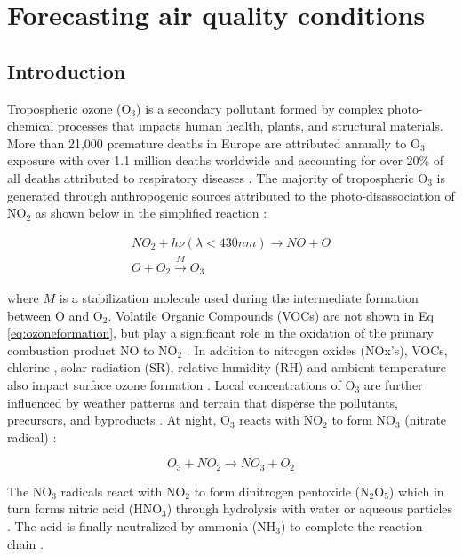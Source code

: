 \chapter{Forecasting air quality conditions}

\section{Introduction}

Tropospheric ozone (O$_{3}$) is a secondary pollutant formed by complex photo-chemical processes that impacts human health, plants, and structural materials. More than 21,000 premature deaths in Europe are attributed annually to O$_{3}$ exposure \citep{WHO2008} with over 1.1 million deaths worldwide and accounting for over 20\% of all deaths attributed to respiratory diseases \citep{Malley2017}. The majority of tropospheric O$_{3}$ is generated through anthropogenic sources \citep{Lelieveld2000, Cooper2006} attributed to the photo-disassociation of NO$_{2}$ as shown below in the simplified reaction \citep{Finlayson1993}:

\begin{equation}
\label{eq:ozoneformation}
\begin{gathered}
NO_{2}+h\nu (\lambda < 430nm) \rightarrow NO+O \\
O+O_{2}\overset{M}{\rightarrow} O_{3}
\end{gathered}
\end{equation}

\noindent
where $M$ is a stabilization molecule used during the intermediate formation between O and O$_{2}$. Volatile Organic Compounds (VOCs) are not shown in Eq \ref{eq:ozoneformation}, but play a significant role in the oxidation of the primary combustion product NO to NO$_{2}$ \citep{Song2011}. In addition to nitrogen oxides (NOx's), VOCs, chlorine \citep{Thornton2010}, solar radiation (SR), relative humidity (RH) and ambient temperature also impact surface ozone formation \citep{Sadanaga2003}.  Local concentrations of O$_{3}$ are further influenced by weather patterns and terrain that disperse the pollutants, precursors, and byproducts \citep{Beck1998}. At night, O$_{3}$ reacts with NO$_{2}$ to form NO$_{3}$ (nitrate radical) \citep{Finlayson1993}:

\begin{equation}
\label{eq:nitrateformation}
O_{3} + NO_{2}\rightarrow NO_{3}+O_{2} 
\end{equation}

The NO$_{3}$ radicals react with NO$_{2}$ to form dinitrogen pentoxide (N$_{2}$O$_{5}$) which in turn forms nitric acid (HNO$_{3}$) through hydrolysis with water or aqueous particles \citep{Song2011}. The acid is finally neutralized by ammonia (NH$_{3}$) to complete the reaction chain \citep{Brown2012}.

